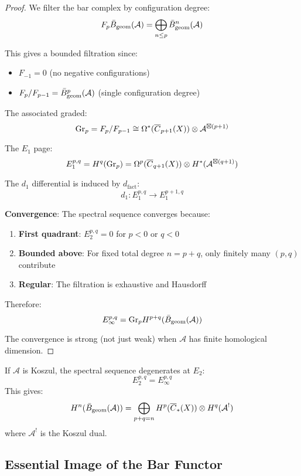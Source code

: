 \begin{proof}
We filter the bar complex by configuration degree:
$$F_p\bar{B}_{\text{geom}}(\mathcal{A}) = \bigoplus_{n \leq p} \bar{B}_{\text{geom}}^n(\mathcal{A})$$

This gives a bounded filtration since:
\begin{itemize}
\item $F_{-1} = 0$ (no negative configurations)
\item $F_p/F_{p-1} = \bar{B}_{\text{geom}}^p(\mathcal{A})$ (single configuration degree)
\end{itemize}

The associated graded:
$$\text{Gr}_p = F_p/F_{p-1} \cong \Omega^*(\overline{C}_{p+1}(X)) \otimes \mathcal{A}^{\boxtimes(p+1)}$$

The $E_1$ page:
$$E_1^{p,q} = H^q(\text{Gr}_p) = \Omega^p(\overline{C}_{q+1}(X)) \otimes H^*(\mathcal{A}^{\boxtimes(q+1)})$$

The $d_1$ differential is induced by $d_{\text{fact}}$:
$$d_1: E_1^{p,q} \to E_1^{p+1,q}$$

\textbf{Convergence}: The spectral sequence converges because:
\begin{enumerate}
\item \textbf{First quadrant}: $E_2^{p,q} = 0$ for $p < 0$ or $q < 0$
\item \textbf{Bounded above}: For fixed total degree $n = p + q$, only finitely many $(p,q)$ contribute
\item \textbf{Regular}: The filtration is exhaustive and Hausdorff
\end{enumerate}

Therefore:
$$E_\infty^{p,q} = \text{Gr}_p H^{p+q}(\bar{B}_{\text{geom}}(\mathcal{A}))$$

The convergence is strong (not just weak) when $\mathcal{A}$ has finite homological dimension.
\end{proof}

\begin{corollary}[Degeneration]
If $\mathcal{A}$ is Koszul, the spectral sequence degenerates at $E_2$:
$$E_2^{p,q} = E_\infty^{p,q}$$
This gives:
$$H^n(\bar{B}_{\text{geom}}(\mathcal{A})) = \bigoplus_{p+q=n} H^p(\overline{C}_{*}(X)) \otimes H^q(\mathcal{A}^!)$$
where $\mathcal{A}^!$ is the Koszul dual.
\end{corollary}

\subsection{Essential Image of the Bar Functor}

